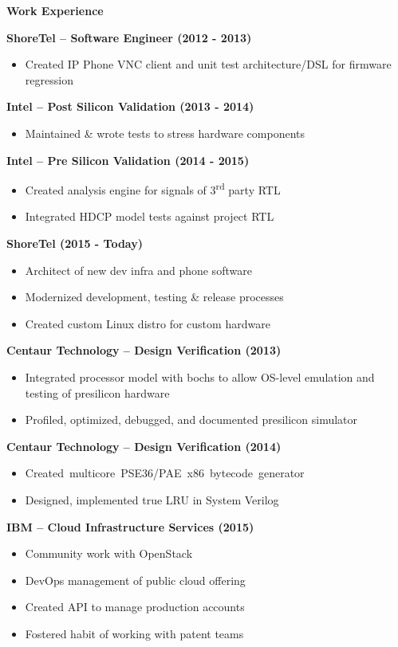 \documentclass{report}
\begin{document}
\textbf{Work Experience} \\
\begin{paracol}{2}
  \textbf{ShoreTel -- Software Engineer (2012 - 2013)}
  \begin{itemize}[label=$\circ$]
  \item Created IP Phone VNC client and unit test architecture/DSL for firmware
    regression
  \end{itemize}

  \textbf{Intel -- Post Silicon Validation (2013 - 2014)}
  \begin{itemize}[label=$\circ$]
  \item Maintained \& wrote tests to stress hardware components
  \end{itemize}

  \textbf{Intel -- Pre Silicon Validation (2014 - 2015)}
  \begin{itemize}[label=$\circ$]
  \item Created analysis engine for signals of 3\textsuperscript{rd} party RTL
  \item Integrated HDCP model tests against project RTL
  \end{itemize}

  \textbf{ShoreTel (2015 - Today)}
  \begin{itemize}[label=$\circ$]
  \item Architect of new dev infra and phone software
  \item Modernized development, testing \& release processes
  \item Created custom Linux distro for custom hardware
  \end{itemize}

  \switchcolumn{}
  \textbf{Centaur Technology -- Design Verification (2013)}
  \begin{itemize}[label=$\circ$]
  \item Integrated processor model with bochs to allow OS-level
    emulation and testing of presilicon hardware
  \item Profiled, optimized, debugged, and documented presilicon simulator
  \end{itemize}

  \textbf{Centaur Technology -- Design Verification (2014)}
  \begin{itemize}[label=$\circ$]
  \item \mbox{Created multicore PSE36/PAE x86 bytecode generator}
  \item Designed, implemented true LRU in System Verilog
  \end{itemize}

  \textbf{IBM -- Cloud Infrastructure Services (2015)}
  \begin{itemize}[label=$\circ$]
  \item Community work with OpenStack
  \item DevOps management of public cloud offering
  \item Created API to manage production accounts
  \item Fostered habit of working with patent teams
  \end{itemize}
\end{paracol}
\end{document}
